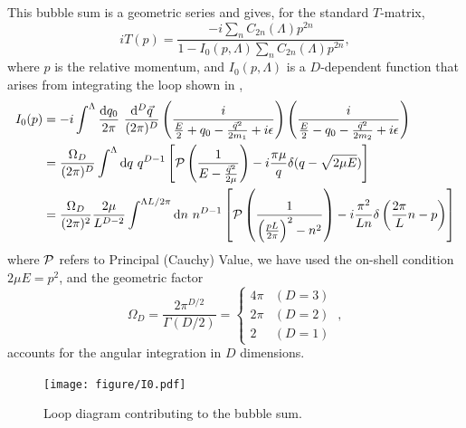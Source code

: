 This bubble sum is a geometric series and gives, for the standard $T$-matrix, \cite{Kaplan:1998we,Beane:2003da}
\begin{equation}\label{eq:T matrix}
iT(p) = \frac{-i\sum_n C_{2n}(\Lambda) p^{2n}}{1-I_0(p,\Lambda) \sum_n C_{2n}(\Lambda) p^{2n}},
\end{equation}
where $p$ is the relative momentum,  and $I_0(p,\Lambda)$ is a $D$-dependent function that arises from integrating the loop shown in ,
\begin{align}
    I_0(p)
    &=-i\int^{\Lambda}
        \frac { \mathrm {d}q_0}{2\pi}\ \frac{\mathrm { d } ^ { D } \vec{ q } } { (2\pi)^ { D } }
        \left( \frac { i } { \frac{E}{2} + q _ { 0 } - \frac{\vec{q}^2}{2m_1} + i \epsilon } \right)
        \left( \frac { i } { \frac{E}{2} - q _ { 0 } - \frac{\vec{q}^2}{2m_2} + i \epsilon } \right)
    \label{eq:I0 in two particle language}\\
    &=\frac{\Omega_D}{(2\pi)^D}\int^{\Lambda}  \mathrm { d } q \ q^{D-1}\left[\PV \left( \frac { 1 } { E - \frac{\vec{q}^2}{2\mu} } \right)
-i\frac{\pi \mu}{q}\delta(q-\sqrt{2 \mu E})\right]
    \\
    &=\frac{\Omega_D}{(2\pi)^2}\frac{2\mu}{L^{D-2}}\int^{\Lambda L/2\pi}  \mathrm { d } n \ n^{D-1}\left[\PV \left( \frac { 1 } { \left(\frac{pL}{2\pi}\right)^2 - n^2 } \right)
-i\frac{\pi^2}{L n}\delta\left(\frac{2\pi}{L}n -p\right)\right]
    \label{eq:I0}
\end{align}
where $\mathcal{P}$ refers to Principal (Cauchy) Value, we have used the on-shell condition $2\mu E=p^2$, and the geometric factor
\begin{equation}
\Omega_D=\frac{2\pi^{D/2}}{\Gamma(D/2)}=
    \begin{cases}
        4\pi    &   (D=3)\\
        2\pi    &   (D=2)\\
        2       &   (D=1)
    \end{cases}\ ,
\end{equation}
accounts for the angular integration in $D$ dimensions.

\begin{figure}[h!]
    \center
    \texttt{[image: figure/I0.pdf]}
    \caption{
        Loop diagram contributing to the bubble sum.
    }
    \label{fig:I0}
\end{figure}

